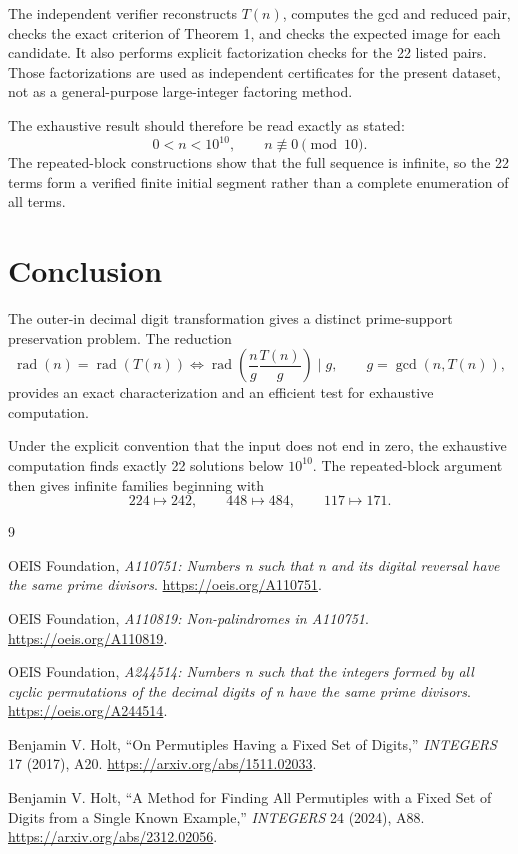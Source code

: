 \documentclass[11pt]{article}
\newcommand{\rad}{\operatorname{rad}}
\begin{document}
The independent verifier reconstructs \(T(n)\), computes the gcd and reduced pair, checks the exact criterion of Theorem 1, and checks the expected image for each candidate. It also performs explicit factorization checks for the 22 listed pairs. Those factorizations are used as independent certificates for the present dataset, not as a general-purpose large-integer factoring method.

The exhaustive result should therefore be read exactly as stated:
\[
0<n<10^{10},\qquad n\not\equiv0\pmod{10}.
\]
The repeated-block constructions show that the full sequence is infinite, so the 22 terms form a verified finite initial segment rather than a complete enumeration of all terms.

\section{Conclusion}

The outer-in decimal digit transformation gives a distinct prime-support preservation problem. The reduction
\[
\rad(n)=\rad(T(n))
\iff
\rad\!\left(\frac{n}{g}\frac{T(n)}{g}\right)\mid g,
\qquad
g=\gcd(n,T(n)),
\]
provides an exact characterization and an efficient test for exhaustive computation.

Under the explicit convention that the input does not end in zero, the exhaustive computation finds exactly 22 solutions below \(10^{10}\). The repeated-block argument then gives infinite families beginning with
\[
224\mapsto242,\qquad
448\mapsto484,\qquad
117\mapsto171.
\]

\begin{thebibliography}{9}

OEIS Foundation,
\emph{A110751: Numbers n such that n and its digital reversal have the same prime divisors}.
\url{https://oeis.org/A110751}.

OEIS Foundation,
\emph{A110819: Non-palindromes in A110751}.
\url{https://oeis.org/A110819}.

OEIS Foundation,
\emph{A244514: Numbers n such that the integers formed by all cyclic permutations of the decimal digits of n have the same prime divisors}.
\url{https://oeis.org/A244514}.

Benjamin V. Holt,
``On Permutiples Having a Fixed Set of Digits,''
\emph{INTEGERS} 17 (2017), A20.
\url{https://arxiv.org/abs/1511.02033}.

Benjamin V. Holt,
``A Method for Finding All Permutiples with a Fixed Set of Digits from a Single Known Example,''
\emph{INTEGERS} 24 (2024), A88.
\url{https://arxiv.org/abs/2312.02056}.

\end{thebibliography}
\end{document}
